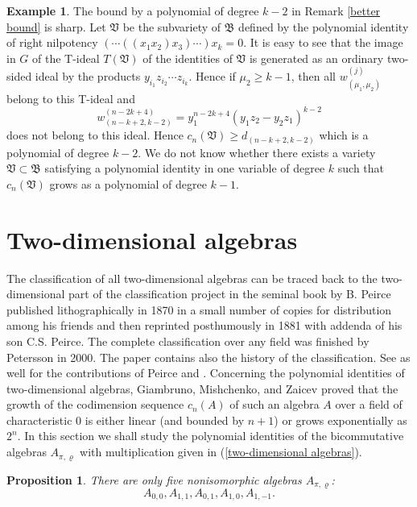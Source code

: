 \documentclass{amsart}[12pt]
\newtheorem{proposition}[theorem]{Proposition}
\theoremstyle{definition}
\newtheorem{example}[theorem]{Example}
\begin{document}
\begin{example} The bound by a polynomial of degree $k-2$ in Remark \ref{better bound} is sharp.
Let $\mathfrak V$ be the subvariety of $\mathfrak B$ defined by the polynomial identity of right nilpotency $(\cdots((x_1x_2)x_3)\cdots )x_k=0$.
It is easy to see that the image in $G$ of the T-ideal $T({\mathfrak V})$ of the identities of $\mathfrak V$
is generated as an ordinary two-sided ideal by the products $y_{i_1}z_{i_2}\cdots z_{i_k}$. Hence if $\mu_2\geq k-1$, then
all $w_{(\mu_1,\mu_2)}^{(j)}$ belong to this T-ideal and
\[
w_{(n-k+2,k-2)}^{(n-2k+4)}=y_1^{n-2k+4}(y_1z_2-y_2z_1)^{k-2}
\]
does not belong to this ideal. Hence
$c_n({\mathfrak V})\geq d_{(n-k+2,k-2)}$ which is a polynomial of degree $k-2$. We do not know whether there exists
a variety ${\mathfrak V}\subset\mathfrak B$ satisfying a polynomial identity
in one variable of degree $k$ such that $c_n({\mathfrak V})$ grows as a polynomial of degree $k-1$.
\end{example}

\section{Two-dimensional algebras}

The classification of all two-dimensional algebras can be traced back to the two-dimensional part of the classification project
in the seminal book by B. Peirce \cite{Pe} published lithographically in 1870
in a small number of copies for distribution among his friends
and then reprinted posthumously in 1881 with addenda of his son C.S. Peirce.
The complete classification over any field was finished by Petersson \cite{P} in 2000. The paper \cite{P} contains also the history of the classification.
See as well \cite{GG} for the contributions of Peirce and \cite{GR, RTS}. Concerning the polynomial identities of two-dimensional algebras,
Giambruno, Mishchenko, and Zaicev \cite{GMZ} proved that the growth of the codimension sequence $c_n(A)$ of such an algebra $A$
over a field of characteristic 0 is either linear (and bounded by $n+1$) or grows exponentially as $2^n$. In this section we shall study the polynomial identities
of the bicommutative algebras $A_{\pi,\varrho}$ with multiplication given in (\ref{two-dimensional algebras}).

\begin{proposition}\label{classification of two-dimensional algebras}
There are only five nonisomorphic algebras $A_{\pi,\varrho}$:
\[
A_{0,0},A_{1,1},A_{0,1},A_{1,0},A_{1,-1}.
\]
\end{proposition}
\end{document}
